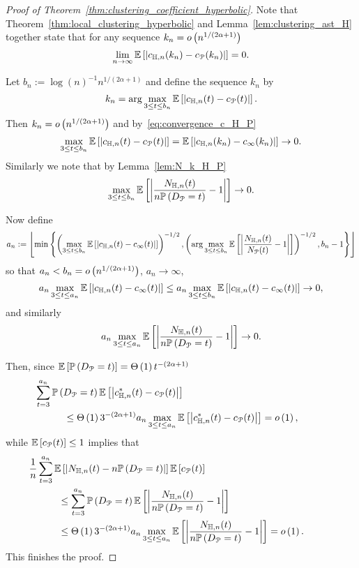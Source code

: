 \begin{proof}[Proof of Theorem~\ref{thm:clustering_coefficient_hyperbolic}]
Note that Theorem~\ref{thm:local_clustering_hyperbolic} and Lemma~\ref{lem:clustering_ast_H} together state that for any sequence $k_n  = o\left(n^{1/(2\alpha + 1)}\right)$
\begin{equation}\label{eq:convergence_c_H_P}
	\lim_{n \to \infty} \mathbb{E}\left[\left|c_{\mathbb{H},n}(k_n) - c_{{\mathcal P}}(k_n)\right|\right] = 0.
\end{equation}

Let $b_n := \log(n)^{-1} n^{1/(2\alpha + 1)}$ and define the sequence $k_n$ by
\[
	k_n = \arg \max_{3 \le t \le b_n} \mathbb{E}\left[\left|c_{\mathbb{H},n}(t) - c_{{\mathcal P}}(t)\right|\right].
\]
Then $k_n = o\left(n^{1/(2\alpha + 1)}\right)$ and by~\eqref{eq:convergence_c_H_P}
\[
	\max_{3 \le t \le b_n} \mathbb{E}\left[\left|c_{\mathbb{H},n}(t) - c_{{\mathcal P}}(t)\right|\right] = \mathbb{E}\left[\left|c_{\mathbb{H},n}(k_n) - c_{\infty}(k_n)\right|\right] \to 0.
\]
Similarly we note that by Lemma~\ref{lem:N_k_H_P}
\[
	\max_{3 \le t \le b_n} \mathbb{E}\left[\left|\frac{N_{\mathbb{H},n}(t)}{n \mathbb{P}\left(D_{{\mathcal P}} = t\right)} - 1\right|\right] \to 0.
\]

Now define
\[
	a_n := \left\lfloor \min \left\{
	\left(\max_{3 \le t \le b_n} \mathbb{E}\left[\left|c_{\mathbb{H},n}(t) - c_{\infty}(t)\right|\right]\right)^{-1/2},
	\left(\arg \max_{3 \le t \le b_n} \mathbb{E}\left[\left|\frac{N_{\mathbb{H},n}(t)}{N_{{\mathcal P}}(t)} - 1\right|\right]\right)^{-1/2},
	b_n - 1 \right\} \right\rfloor
\]
so that $a_n < b_n = o\left(n^{1/(2\alpha + 1)}\right)$, $a_n \to \infty$, 
\[
	a_n \max_{3 \le t \le a_n} \mathbb{E}\left[\left|c_{\mathbb{H},n}(t) - c_{\infty}(t)\right|\right] 
	\le a_n \max_{3 \le t \le b_n} \mathbb{E}\left[\left|c_{\mathbb{H},n}(t) - c_{\infty}(t)\right|\right] \to 0,
\]
and similarly
\[
	a_n \max_{3 \le t \le a_n} \mathbb{E}\left[\left|\frac{N_{\mathbb{H},n}(t)}{n \mathbb{P}\left(D_{{\mathcal P}} = t\right)} - 1\right|\right] \to 0.
\]

Then, since $\mathbb{E}\left[\mathbb{P}\left(D_{{\mathcal P}} = t\right)\right] = \Theta\left(1\right) t^{-(2\alpha + 1)}$
\begin{align*}
	&\hspace{-30pt}\sum_{t = 3}^{a_n} \Prob{D_\Pcal = t} \Exp{\left|c_{\H,n}^\ast(t) - c_{\Pcal}(t)\right|}\\
	&\le \bigT{1} 3^{-(2\alpha+1)} a_n \max_{3 \le t \le a_n} \Exp{\left|c_{\H,n}^\ast(t) - c_{\Pcal}(t)\right|}
	= \smallO{1},
\end{align*}
while $\mathbb{E}\left[c_{{\mathcal P}}(t)\right] \le 1$ implies that
\begin{align*}
	&\hspace{-30pt}\frac{1}{n} \sum_{t = 3}^{a_n} \Exp{\left|N_{\H,n}(t) - n \Prob{D_\Pcal = t}\right|}\Exp{c_\Pcal(t)} \\
	&\le \sum_{t = 3}^{a_n} \Prob{D_\Pcal = t} \Exp{\left|\frac{N_{\H,n}(t)}{n \Prob{D_\Pcal = t}} - 1\right|} \\
	&\le \bigT{1} 3^{-(2\alpha+1)} a_n \max_{3 \le t \le a_n} 
		\Exp{\left|\frac{N_{\H,n}(t)}{n \Prob{D_\Pcal = t}} - 1\right|} = \smallO{1}.
\end{align*}
This finishes the proof.
\end{proof}